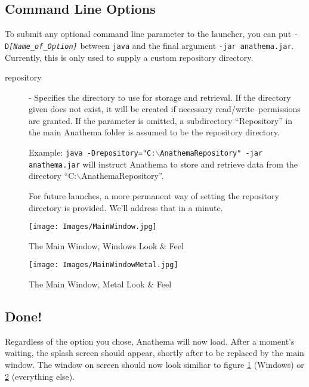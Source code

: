 \subsection{Command Line Options}
To submit any optional command line parameter to the launcher, you can put \linebreak
\texttt{-D\emph{[Name\_of\_Option]}} between \texttt{java} and the final argument \texttt{-jar anathema.jar}. Currently, this is only used to supply a custom repository directory.

\begin{description}
\item[repository] - Specifies the directory to use for storage and retrieval. If the directory given does not exist, it will be created if necessary read/write--permissions are granted. If the parameter is omitted, a subdirectory ``Repository'' in the main Anathema folder is assumed to be the repository directory.

	Example:\newline
	\texttt{java -Drepository="C:$\backslash$AnathemaRepository" -jar anathema.jar} will instruct Anathema to store and retrieve data from the directory 
	\linebreak``C:$\backslash$AnathemaRepository''.
	
For future launches, a more permanent way of setting the repository directory is provided. We'll address that in a minute.
\end{description}

\begin{figure}[htb]
	\centering
		\texttt{[image: Images/MainWindow.jpg]}
	\caption{The Main Window, Windows Look \& Feel}
	\label{fig:MainWindow}
\end{figure}

\begin{figure}[htb]
	\centering
		\texttt{[image: Images/MainWindowMetal.jpg]}
	\caption{The Main Window, Metal Look \& Feel}
	\label{fig:MainWindowMetal}
\end{figure}

\subsection{Done!}
Regardless of the option you chose, Anathema will now load. After a moment's waiting, the splash screen should appear, shortly after to be replaced by the main window. The window on screen should now look similiar to figure \ref{fig:MainWindow} (Windows) or \ref{fig:MainWindowMetal} (everything else).

